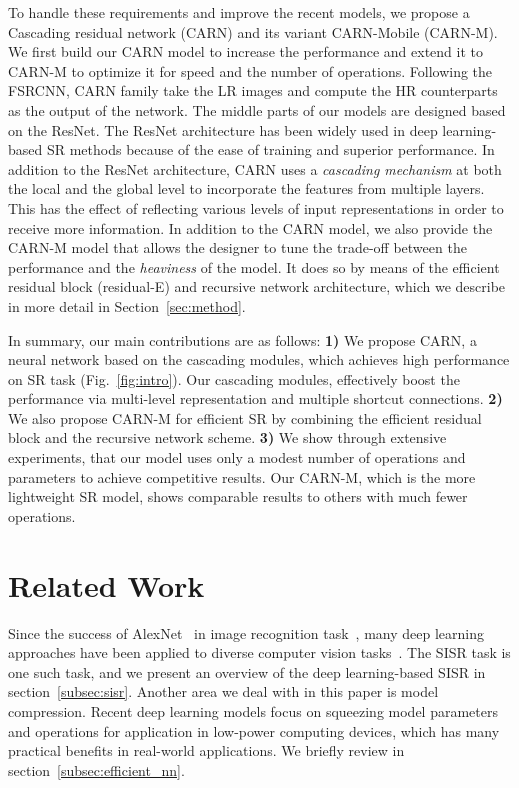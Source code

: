 \documentclass[runningheads]{llncs}
\begin{document}
To handle these requirements and improve the recent models, we propose a Cascading residual network (CARN) and its variant CARN-Mobile (CARN-M). We first build our CARN model to increase the performance and extend it to CARN-M to optimize it for speed and the number of operations. Following the FSRCNN\cite{fsrcnn2016}, CARN family take the LR images and compute the HR  counterparts as the output of the network. The middle parts of our models are designed based on the ResNet\cite{resnet}. The ResNet architecture has been widely used in deep learning-based SR methods\cite{drnn2017,mdsr2017} because of the ease of training and superior performance. In addition to the ResNet architecture, CARN uses a \textit{cascading mechanism} at both the local and the global level to incorporate the features from multiple layers. This has the effect of reflecting various levels of input representations in order to receive more information. In addition to the CARN model, we also provide the CARN-M model that allows the designer to tune the trade-off between the performance and the \textit{heaviness} of the model. It does so by means of the efficient residual block (residual-E) and recursive network architecture, which we describe in more detail in Section~\ref{sec:method}.

In summary, our main contributions are as follows: \textbf{1)} We propose CARN, a neural network based on the cascading modules, which achieves high performance on SR task (Fig.~\ref{fig:intro}). Our cascading modules, effectively boost the performance via multi-level representation and multiple shortcut connections. \textbf{2)} We also propose CARN-M for efficient SR by combining the efficient residual block and the recursive network scheme. \textbf{3)} We show through extensive experiments, that our model uses only a modest number of operations and parameters to achieve competitive results. Our CARN-M, which is the more lightweight SR model, shows comparable results to others with much fewer operations.

\section{Related Work}
\label{sec:related_work}
Since the success of AlexNet~\cite{alexnet} in image recognition task~\cite{imagenet2009}, many deep learning approaches have been applied to diverse computer vision tasks~\cite{ssd,fasterrcnn,deconvnet,color}. The SISR task is one such task, and we present an overview of the deep learning-based SISR in section~\ref{subsec:sisr}. Another area we deal with in this paper is model compression. Recent deep learning models focus on squeezing model parameters and operations for application in low-power computing devices, which has many practical benefits in real-world applications. We briefly review in section~\ref{subsec:efficient_nn}.
\end{document}
